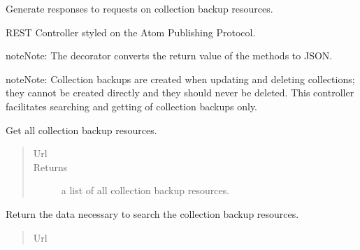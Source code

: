 \documentclass[letterpaper,10pt,english]{sphinxmanual}
\begin{document}
\begin{fulllineitems}
\label{api:onlinelinguisticdatabase.controllers.collectionbackups.CollectionbackupsController}
Generate responses to requests on collection backup resources.

REST Controller styled on the Atom Publishing Protocol.

\begin{notice}{note}{Note:}
The  decorator converts the return value of the methods to
JSON.
\end{notice}

\begin{notice}{note}{Note:}
Collection backups are created when updating and deleting collections;
they cannot be created directly and they should never be deleted.  This
controller facilitates searching and getting of collection backups only.
\end{notice}

\begin{fulllineitems}
\label{api:onlinelinguisticdatabase.controllers.collectionbackups.CollectionbackupsController.index}
Get all collection backup resources.
\begin{quote}\begin{description}
\item[{Url }] \leavevmode
{}

\item[{Returns}] \leavevmode
a list of all collection backup resources.

\end{description}\end{quote}

\end{fulllineitems}


\begin{fulllineitems}
\label{api:onlinelinguisticdatabase.controllers.collectionbackups.CollectionbackupsController.new_search}
Return the data necessary to search the collection backup resources.
\begin{quote}\begin{description}
\item[{Url }] \leavevmode
{}


\end{description}
\end{quote}
\end{fulllineitems}
\end{fulllineitems}
\end{document}
